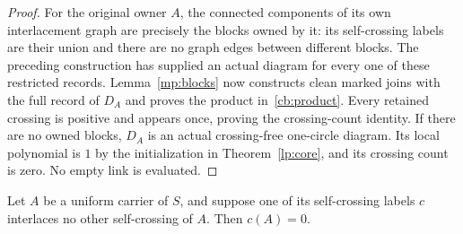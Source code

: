 \begin{proof}
For the original owner $A$, the connected components of its own
interlacement graph are precisely the blocks owned by it: its
self-crossing labels are their union and there are no graph edges
between different blocks. The preceding construction has supplied an
actual diagram for every one of these restricted records.
Lemma~\ref{mp:blocks} now constructs clean marked joins with the full
record of $D_A$ and proves the product in~\eqref{cb:product}.
Every retained crossing is positive and appears once, proving the
crossing-count identity. If there are no owned blocks, $D_A$ is an
actual crossing-free one-circle diagram. Its local polynomial is $1$
by the initialization in Theorem~\ref{lp:core}, and its crossing count
is zero. No empty link is evaluated.
\end{proof}

\begin{lemma}
\label{cb:singleton}\leanok
Let $A$ be a uniform carrier of $S$, and suppose one of its self-crossing
labels $c$ interlaces no other self-crossing of $A$. Then $c(A)=0$.

\end{lemma}

